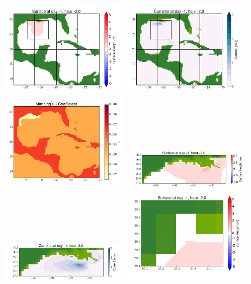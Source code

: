 \documentclass[11pt]{article}
\begin{document}
\vskip 10pt 
\includegraphics[width=0.475\textwidth]{frame0046fig1.png}
\includegraphics[width=0.475\textwidth]{frame0046fig2.png}
\vskip 10pt 
\includegraphics[width=0.475\textwidth]{frame0046fig3.png}
\includegraphics[width=0.475\textwidth]{frame0046fig4.png}
\vskip 10pt 
\includegraphics[width=0.475\textwidth]{frame0046fig5.png}
\includegraphics[width=0.475\textwidth]{frame0046fig6.png}
\end{document}

